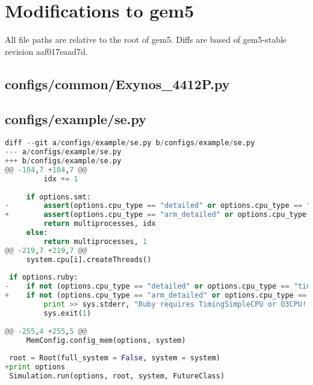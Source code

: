 \chapter{Modifications to gem5}
\label{apx:gem5files}
All file paths are relative to the root of gem5. Diffs are based of gem5-stable revision aaf017eaad7d.

\section{configs/common/Exynos\_4412P.py}
\label{gem5exynos4412p}

\vfill

\section{configs/example/se.py}
\begin{lstlisting}[language=python]
diff --git a/configs/example/se.py b/configs/example/se.py
--- a/configs/example/se.py
+++ b/configs/example/se.py
@@ -104,7 +104,7 @@
         idx += 1
 
     if options.smt:
-        assert(options.cpu_type == "detailed" or options.cpu_type == "inorder")
+        assert(options.cpu_type == "arm_detailed" or options.cpu_type == "inorder")
         return multiprocesses, idx
     else:
         return multiprocesses, 1
@@ -219,7 +219,7 @@
     system.cpu[i].createThreads()
 
 if options.ruby:
-    if not (options.cpu_type == "detailed" or options.cpu_type == "timing"):
+    if not (options.cpu_type == "arm_detailed" or options.cpu_type == "timing"):
         print >> sys.stderr, "Ruby requires TimingSimpleCPU or O3CPU!!"
         sys.exit(1)
 
@@ -255,4 +255,5 @@
     MemConfig.config_mem(options, system)
 
 root = Root(full_system = False, system = system)
+print options
 Simulation.run(options, root, system, FutureClass)
\end{lstlisting}
\vfill

